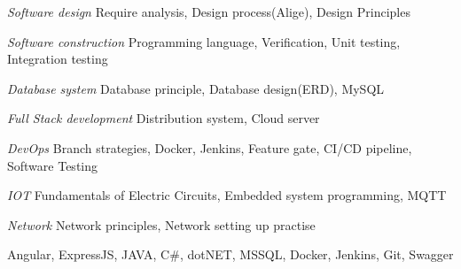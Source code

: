 \begin{resume_list}
	\item {\it Software design} {\hfill Require analysis, Design process(Alige), Design Principles}
	\item {\it Software construction}  {\hfill Programming language, Verification, Unit testing, Integration testing}
	\item {\it Database system} {\hfill Database principle, Database design(ERD), MySQL}
	\item {\it Full Stack development} {\hfill Distribution system, Cloud server}
	\item {\it DevOps} {\hfill Branch strategies, Docker, Jenkins, Feature gate, CI/CD pipeline, Software Testing}
	\item {\it IOT} {\hfill Fundamentals of Electric Circuits, Embedded system programming, MQTT}
	\item {\it Network} {\hfill Network principles, Network setting up practise}
\end{resume_list}

\begin{resume_list}
\item {Angular, ExpressJS, JAVA, C\#, dotNET, MSSQL, Docker, Jenkins, Git, Swagger}{}
\end{resume_list}